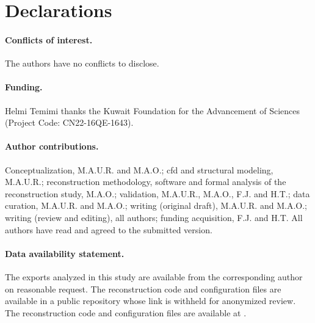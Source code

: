 \documentclass[12pt,a4paper]{article}
\newcommand{\CFD}{\ac{cfd}\xspace}
\theoremstyle{definition}
\numberwithin{equation}{section}
\newif\ifanonymized
\providecommand{\DIFdeltex}[1]{{\protect\color{red} \scriptsize #1}} %
\providecommand{\DIFdelbegin}{} %
\providecommand{\DIFdelend}{} %
\providecommand{\DIFdel}[1]{\texorpdfstring{\DIFdeltex{#1}}{}} %
\newcommand{\DIFscaledelfig}{0.5}
\newlength{\DIFdelgraphicswidth} %
\newlength{\DIFdelgraphicsheight} %
\newcommand{\DIFdelincludegraphics}[2][]{%
\sbox{\DIFdelgraphicsbox}{\DIFOincludegraphics[#1]{#2}}%
\settoboxwidth{\DIFdelgraphicswidth}{\DIFdelgraphicsbox} %
\settoboxtotalheight{\DIFdelgraphicsheight}{\DIFdelgraphicsbox} %
\scalebox{\DIFscaledelfig}{%
\parbox[b]{\DIFdelgraphicswidth}{\usebox{\DIFdelgraphicsbox}\\[-\baselineskip] \rule{\DIFdelgraphicswidth}{0em}}\llap{\resizebox{\DIFdelgraphicswidth}{\DIFdelgraphicsheight}{%
\setlength{\unitlength}{\DIFdelgraphicswidth}%
\begin{picture}(1,1)%
\thicklines\linethickness{2pt} %
{\color[rgb]{1,0,0}\put(0,0){\framebox(1,1){}}}%
{\color[rgb]{1,0,0}\put(0,0){\line( 1,1){1}}}%
{\color[rgb]{1,0,0}\put(0,1){\line(1,-1){1}}}%
\end{picture}%
}\hspace*{3pt}}} %
} %
\DeclareRobustCommand{\DIFdelbegin}{\DIFOdelbegin \let\includegraphics\DIFdelincludegraphics} %
\DeclareRobustCommand{\DIFdelend}{\DIFOaddend \let\includegraphics\DIFOincludegraphics} %
\begin{document}
\section*{Declarations}
\paragraph{Conflicts of interest.} The authors have no conflicts to disclose.

\ifanonymized
\paragraph{Funding and author contributions.} Removed for anonymized review.
\else
\paragraph{Funding.} Helmi Temimi thanks the Kuwait Foundation for the Advancement of Sciences (Project Code: CN22-16QE-1643).

\paragraph{Author contributions.} Conceptualization, M.A.U.R. and M.A.O.; \CFD and structural modeling, M.A.U.R.; reconstruction methodology, software and formal analysis of the reconstruction study, M.A.O.; validation, M.A.U.R., M.A.O., F.J. and H.T.; data curation, M.A.U.R. and M.A.O.; writing (original draft), M.A.U.R. and M.A.O.; writing (review and editing), all authors; funding acquisition, F.J. and H.T. All authors have read and agreed to the submitted version.
\fi


\DIFdelbegin %

\paragraph{\DIFdel{Data availability statement.}} %
\addtocounter{paragraph}{-1}%
\DIFdel{The }%
\DIFdel{exports analyzed in this study are available from the corresponding author on reasonable request.  The reconstruction code and configuration files are available in a public repository whose link is withheld for anonymized review. The reconstruction code and configuration files are available at }%
\DIFdel{.}%
\DIFdelend 
\end{document}
